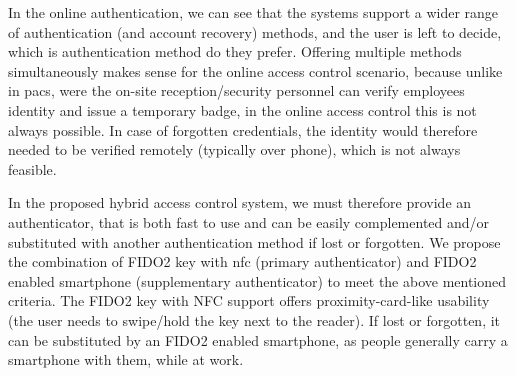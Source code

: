 In the online authentication, we can see that the systems support a wider range of authentication (and account recovery) methods, and the user is left to decide, which is authentication method do they prefer. Offering multiple methods simultaneously makes sense for the online access control scenario, because unlike in \acrshort{pacs}, were the on-site reception/security personnel can verify employees identity and issue a temporary badge, in the online access control this is not always possible. In case of forgotten credentials, the identity would therefore needed to be verified remotely (typically over phone), which is not always feasible.

In the proposed hybrid access control system, we must therefore provide an authenticator, that is both fast to use and can be easily complemented and/or substituted with another authentication method if lost or forgotten. We propose the combination of FIDO2 key with \acrshort{nfc} (primary authenticator) and FIDO2 enabled smartphone (supplementary authenticator) to meet the above mentioned criteria. The FIDO2 key with NFC support offers proximity-card-like usability (the user needs to swipe/hold the key next to the reader). If lost or forgotten, it can be substituted by an FIDO2 enabled smartphone, as people generally carry a smartphone with them, while at work.


